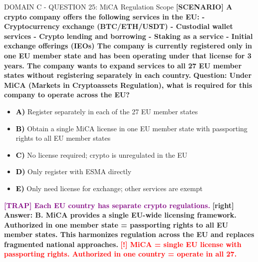 \documentclass[11pt,a4paper]{beamer}
\newcommand{\redflag}[1]{\textcolor{red}{\textbf{[!] #1}}}
\newcommand{\trap}[1]{\textcolor{purple}{\textbf{[TRAP] #1}}}
\newcommand{\correct}[1]{\textcolor{green!50!black}{\textbf{[right] #1}}}
\newcommand{\scenario}[1]{\textcolor{blue!70!black}{\textbf{[SCENARIO] #1}}}
\newcommand{\option}[1]{\textcolor{black}{\textbf{#1}}}
\begin{document}
\begin{frame}{DOMAIN C - QUESTION 25: MiCA Regulation Scope}
\scenario{A crypto company offers the following services in the EU:
- Cryptocurrency exchange (BTC/ETH/USDT)
- Custodial wallet services
- Crypto lending and borrowing
- Staking as a service
- Initial exchange offerings (IEOs)
The company is currently registered only in one EU member state and has been operating under that license for 3 years. The company wants to expand services to all 27 EU member states without registering separately in each country.}
\vspace{0.2cm}
\textbf{Question: Under MiCA (Markets in Cryptoassets Regulation), what is required for this company to operate across the EU?}
\vspace{0.1cm}
\begin{itemize}
    \item \option{A)} Register separately in each of the 27 EU member states
    \item \option{B)} Obtain a single MiCA license in one EU member state with passporting rights to all EU member states
    \item \option{C)} No license required; crypto is unregulated in the EU
    \item \option{D)} Only register with ESMA directly
    \item \option{E)} Only need license for exchange; other services are exempt
\end{itemize}
\vspace{0.2cm}
\trap{Each EU country has separate crypto regulations.}
\correct{Answer: B. MiCA provides a single EU-wide licensing framework. Authorized in one member state = passporting rights to all EU member states. This harmonizes regulation across the EU and replaces fragmented national approaches.}
\redflag{MiCA = single EU license with passporting rights. Authorized in one country = operate in all 27.}
\end{frame}
\end{document}
